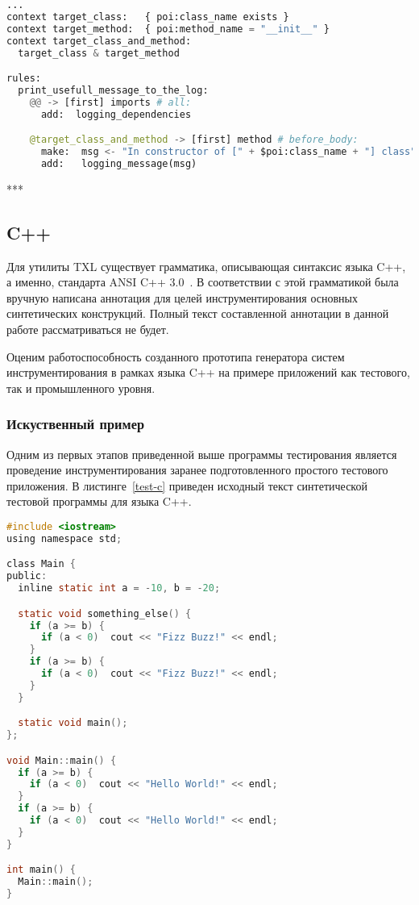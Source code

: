 \begin{lstlisting}[frame=single, language=Python, label={test-rules-python}, caption={Описание правил инструментирования. Python-проект.}]
...
context target_class:   { poi:class_name exists }
context target_method:  { poi:method_name = "__init__" }
context target_class_and_method:
  target_class & target_method

rules:
  print_usefull_message_to_the_log:
    @@ -> [first] imports # all:
      add:  logging_dependencies

    @target_class_and_method -> [first] method # before_body:
      make:  msg <- "In constructor of [" + $poi:class_name + "] class";
      add:   logging_message(msg)
\end{lstlisting}

***

\subsection{C++}

Для утилиты TXL существует грамматика, описывающая синтаксис языка C++, а именно, стандарта ANSI C++ 3.0~\cite{txl-resources}.
В соответствии с этой грамматикой была вручную написана аннотация для целей инструментирования основных синтетических конструкций.
Полный текст составленной аннотации в данной работе рассматриваться не будет.

Оценим работоспособность созданного прототипа генератора систем инструментирования в рамках языка C++ на примере приложений как тестового, так и промышленного уровня.

\subsubsection{Искуственный пример}

Одним из первых этапов приведенной выше программы тестирования является проведение инструментирования заранее подготовленного простого тестового приложения.
В листинге~\ref{test-c} приведен исходный текст синтетической тестовой программы для языка C++.

\begin{lstlisting}[frame=single, language=C, label={test-c}, caption={Исходный текст тестового приложения.}]
#include <iostream>
using namespace std;

class Main {
public:
  inline static int a = -10, b = -20;

  static void something_else() {
    if (a >= b) {
      if (a < 0)  cout << "Fizz Buzz!" << endl;
    }
    if (a >= b) {
      if (a < 0)  cout << "Fizz Buzz!" << endl;
    }
  }

  static void main();
};

void Main::main() {
  if (a >= b) {
    if (a < 0)  cout << "Hello World!" << endl;
  }
  if (a >= b) {
    if (a < 0)  cout << "Hello World!" << endl;
  }
}

int main() {
  Main::main();
}
\end{lstlisting}

